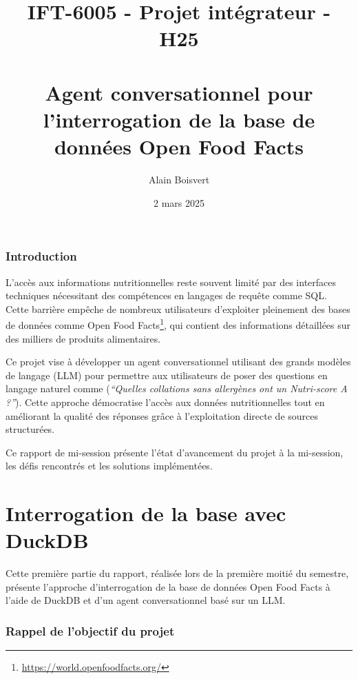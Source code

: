\documentclass[a4paper,11pt]{article}
\title{IFT-6005 - Projet intégrateur - H25 \\ ~ \\ Agent conversationnel pour l'interrogation de la base de données Open Food Facts}
\author{Alain Boisvert}
\date{2 mars 2025}
\begin{document}

\newpage

\tableofcontents
\newpage

\section{Introduction}  
\label{sec:probleme}

L'accès aux informations nutritionnelles reste souvent limité par des interfaces techniques
nécessitant des compétences en langages de requête comme SQL. Cette barrière empêche de nombreux
utilisateurs d'exploiter pleinement des bases de données 
comme Open Food Facts\footnote{\url{https://world.openfoodfacts.org/}}, 
qui contient des informations détaillées sur des milliers de produits alimentaires. 

Ce projet vise à développer un agent conversationnel utilisant des grands modèles de langage (LLM) 
pour permettre aux utilisateurs de poser des questions en langage naturel 
comme (\textit{\enquote{Quelles collations sans allergènes ont un Nutri-score A ?}}). 
Cette approche démocratise l'accès aux données nutritionnelles tout en améliorant la qualité
des réponses grâce à l'exploitation directe de sources structurées. 

Ce rapport de mi-session présente l'état d'avancement du projet à la mi-session, les défis rencontrés et les solutions implémentées.


\part{Interrogation de la base avec DuckDB}
\label{part:duckdb}

Cette première partie du rapport, réalisée lors de la première moitié du semestre, présente l'approche d'interrogation de la base de données Open Food Facts à l'aide de DuckDB et d'un agent conversationnel basé sur un LLM.


\section{Rappel de l'objectif du projet}
\label{sec:revue}
\end{document}
